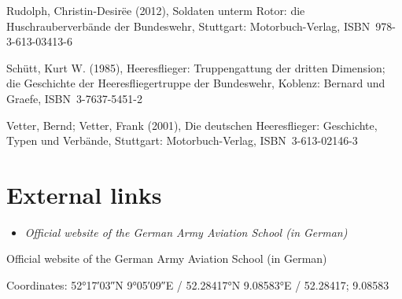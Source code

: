 Rudolph, Christin-Desirëe (2012), Soldaten unterm Rotor: die
Huschrauberverbände der Bundeswehr, Stuttgart: Motorbuch-Verlag,
ISBN~978-3-613-03413-6

Schütt, Kurt W. (1985), Heeresflieger: Truppengattung der dritten
Dimension; die Geschichte der Heeresfliegertruppe der Bundeswehr,
Koblenz: Bernard und Graefe, ISBN~3-7637-5451-2

Vetter, Bernd; Vetter, Frank (2001), Die deutschen Heeresflieger:
Geschichte, Typen und Verbände, Stuttgart: Motorbuch-Verlag,
ISBN~3-613-02146-3

\section{External links}\label{external-links}

\begin{itemize}
\item
  \emph{Official website of the German Army Aviation School (in German)}
\end{itemize}

Official website of the German Army Aviation School (in German)

Coordinates: 52°17′03″N 9°05′09″E﻿ / ﻿52.28417°N 9.08583°E﻿ / 52.28417;
9.08583
